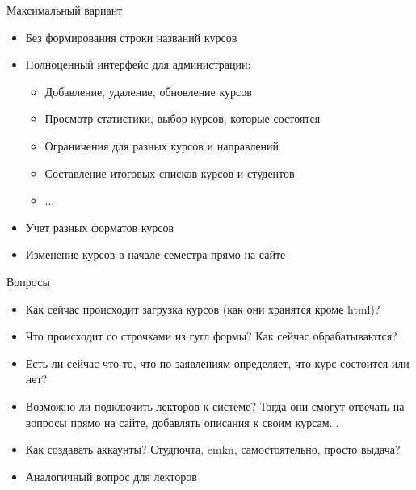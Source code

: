 \documentclass[10pts]{beamer}
\begin{document}
\begin{frame}{Максимальный вариант}
\begin{itemize}
    \item Без формирования строки названий курсов
    \item Полноценный интерфейс для администрации:
    \begin{itemize}
        \item Добавление, удаление, обновление курсов
        \item Просмотр статистики, выбор курсов, которые состоятся
        \item Ограничения для разных курсов и направлений
        \item Составление итоговых списков курсов и студентов
        \item ...
    \end{itemize}
    \item Учет разных форматов курсов
    \item Изменение курсов в начале семестра прямо на сайте
\end{itemize}
\end{frame}

\begin{frame}{Вопросы}
\begin{itemize}
    \item Как сейчас происходит загрузка курсов (как они хранятся кроме html)?
    \item Что происходит со строчками из гугл формы? Как сейчас обрабатываются?
    \item Есть ли сейчас что-то, что по заявлениям определяет, что курс состоится или нет?
    \item Возможно ли подключить лекторов к системе? Тогда они смогут отвечать на вопросы прямо на сайте, добавлять описания к своим курсам...
    \item Как создавать аккаунты? Студпочта, emkn, самостоятельно, просто выдача? 
    \item Аналогичный вопрос для лекторов
\end{itemize}
\end{frame}
\end{document}
